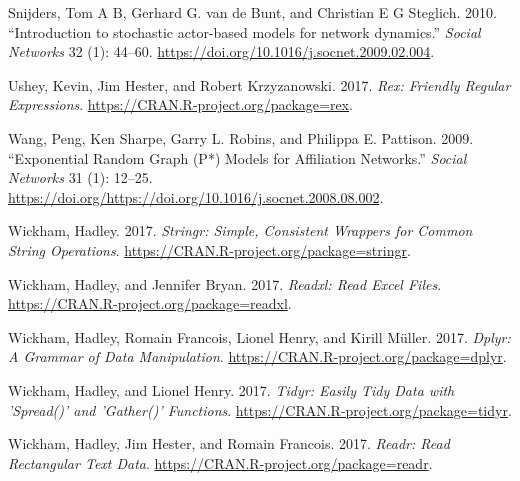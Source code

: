 \documentclass[]{book}
\begin{document}
\leavevmode\hypertarget{ref-Snijders2010}{}%
Snijders, Tom A B, Gerhard G. van de Bunt, and Christian E G Steglich. 2010. ``Introduction to stochastic actor-based models for network dynamics.'' \emph{Social Networks} 32 (1): 44--60. \url{https://doi.org/10.1016/j.socnet.2009.02.004}.

\leavevmode\hypertarget{ref-R-rex}{}%
Ushey, Kevin, Jim Hester, and Robert Krzyzanowski. 2017. \emph{Rex: Friendly Regular Expressions}. \url{https://CRAN.R-project.org/package=rex}.

\leavevmode\hypertarget{ref-Wang2009}{}%
Wang, Peng, Ken Sharpe, Garry L. Robins, and Philippa E. Pattison. 2009. ``Exponential Random Graph (P*) Models for Affiliation Networks.'' \emph{Social Networks} 31 (1): 12--25. \url{https://doi.org/https://doi.org/10.1016/j.socnet.2008.08.002}.

\leavevmode\hypertarget{ref-R-stringr}{}%
Wickham, Hadley. 2017. \emph{Stringr: Simple, Consistent Wrappers for Common String Operations}. \url{https://CRAN.R-project.org/package=stringr}.

\leavevmode\hypertarget{ref-R-readxl}{}%
Wickham, Hadley, and Jennifer Bryan. 2017. \emph{Readxl: Read Excel Files}. \url{https://CRAN.R-project.org/package=readxl}.

\leavevmode\hypertarget{ref-R-dplyr}{}%
Wickham, Hadley, Romain Francois, Lionel Henry, and Kirill Müller. 2017. \emph{Dplyr: A Grammar of Data Manipulation}. \url{https://CRAN.R-project.org/package=dplyr}.

\leavevmode\hypertarget{ref-R-tidyr}{}%
Wickham, Hadley, and Lionel Henry. 2017. \emph{Tidyr: Easily Tidy Data with 'Spread()' and 'Gather()' Functions}. \url{https://CRAN.R-project.org/package=tidyr}.

\leavevmode\hypertarget{ref-R-readr}{}%
Wickham, Hadley, Jim Hester, and Romain Francois. 2017. \emph{Readr: Read Rectangular Text Data}. \url{https://CRAN.R-project.org/package=readr}.
\end{document}
